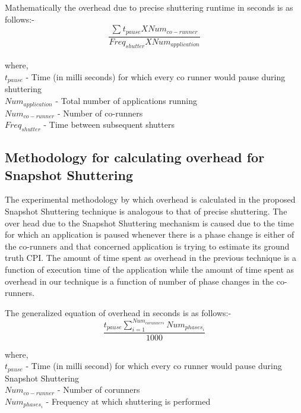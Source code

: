 \documentclass[pageno]{jpaper}
\begin{document}
\vspace{-0.8 mm}Mathematically the overhead due to precise shuttering runtime in seconds is as follows:- \\
\begin{equation}\label{eq:1}
\frac{\displaystyle\sum_ {}{} t_{pause} X Num_{co-runner}}{Freq_{shutter} X Num_{application}} 
\end{equation}
\\
where, \\
$t_{pause}$ - Time (in milli seconds) for which every co runner would pause during shuttering \\
$Num_{application} $ - Total number of applications running \\
$Num_{co-runner}$ - Number of co-runners \\
$Freq_{shutter}$ - Time between subsequent shutters
\subsection{Methodology for calculating overhead for Snapshot Shuttering}
\label{subsec:MethodologyforcalculatingoverheadforSnapshotShuttering}

\vspace{-0.5 mm} The experimental methodology by which overhead is calculated in the proposed Snapshot Shuttering technique is analogous to that of precise shuttering. The over head due to the Snapshot Shuttering mechanism is caused due to the time for which an application is paused whenever there is a phase change is either of the co-runners and that concerned application is trying to estimate its ground truth CPI. The amount of time spent as overhead in the previous technique is a function of execution time of the application while the amount of time spent as overhead in our technique is a function of number of phase changes in the co-runners.

The generalized equation of overhead in seconds is as follows:- 
\vspace{-3 mm}
\begin{equation} 
\label{eq:2}
\frac{ t_{pause} \displaystyle\sum_ {i=1}^{Num_{corunners}}Num_{phases  _{i}}}{1000} 
\end{equation}

where, \\
$t_{pause}$ - Time (in milli second) for which every co runner would pause during Snapshot Shuttering \\
$Num_{co-runner}$ - Number of corunners \\
$ Num_{phases  _{i}} $ - Frequency at which shuttering is performed
\end{document}
